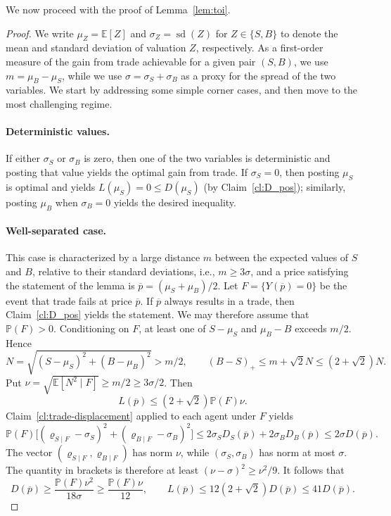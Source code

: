 \documentclass[11pt]{article}
\newcommand{\E}[1]{\mathbb E\left[#1\right]}
\renewcommand{\P}[1]{\mathbb P\left(#1\right)}
\DeclareMathOperator{\sd}{sd}
\begin{document}
We now proceed with the proof of Lemma~\ref{lem:toi}.


\tradeorinformation*

\begin{proof}
    We write $\mu_Z=\E{Z}$ and $\sigma_Z=\sd(Z)$ for $Z \in \{S,B\}$ {to denote the mean and standard deviation of valuation} $Z${, respectively}. As a {first-order} measure of the gain from trade achievable {for a given pair} $(S,B)${, we use} $m=\mu_B - \mu_S$, while we use $\sigma=\sigma_S+\sigma_B$ as a proxy for {the spread of the two variables}. We start by addressing some simple corner cases, and then move to the most challenging regime. 
    
    \paragraph{Deterministic values.} If either $\sigma_S$ or $\sigma_B$ {is} zero, then one of the two variables is deterministic and posting that value yields the optimal gain from trade. If $\sigma_{{S}}=0$, then posting $\mu_S$ is optimal and yields $L(\mu_S)=0 \le D(\mu_S)$ (by Claim~\ref{cl:D_pos}); similarly, posting $\mu_B$ when $\sigma_B=0$ yields the desired inequality. 

    \paragraph{Well-separated case.} This case is characterized by a large distance $m$ between the expected values of $S$ and $B$, {relative to their standard deviations}, i.e.,  $m\ge3\sigma$, and a price satisfying the statement of the lemma is $\overline  p=(\mu_S+\mu_B)/2$. Let $F=\{{Y(\overline p)}=0\}$ be the {event that trade fails at price} $\overline p$. If $\overline p$ always {results} in a trade, then Claim~\ref{cl:D_pos} yields the statement. {We may therefore assume} that $\mathbb P(F)>0$. Conditioning on $F$, at least one of $S-\mu_S$ and $\mu_B-B$ exceeds $m/2$. Hence
\[
 N=\sqrt{(S-\mu_S)^2+(B-\mu_B)^2}>m/2,
 \qquad (B-S)_+\le m+\sqrt2N\le(2+\sqrt2)N.
\]
Put $\nu=\sqrt{\E{N^2\mid F}}\ge m/2\ge3\sigma/2$. Then
\begin{equation}\label{eq:trade-large-gap-loss}
 L(\overline  p)\le(2+\sqrt2){\P{F}}\nu.
\end{equation}
Claim~\ref{cl:trade-displacement} applied to each agent under $F$ yields
\[
 \P{F}\bigl[(\varrho_{S\mid F}-\sigma_S)^2+(\varrho_{B\mid F}-\sigma_B)^2\bigr]
 \le2\sigma_SD_S(\overline p)+2\sigma_BD_B(\overline p)
 \le2\sigma D(\overline p).
\]
The vector $(\varrho_{S\mid F},\varrho_{B\mid F})$ has norm $\nu$, while $(\sigma_S,\sigma_B)$ has norm at most $\sigma$. The {quantity in brackets} is therefore at least $(\nu-\sigma)^2\ge\nu^2/9$. It follows that
\[
 D(\overline  p)\ge\frac{{\P{F}}\nu^2}{18\sigma}\ge\frac{{\P{F}}\nu}{12},
 \qquad L(\overline  p)\le12(2+\sqrt2)D(\overline  p)\le41D(\overline  p).
\]


\end{proof}
\end{document}
